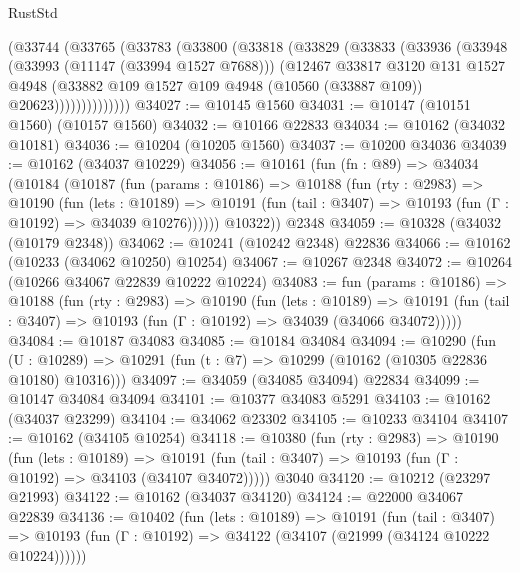 \begin{lexlean}{RustStd}
\begin{coremodule}
          (@33744
            (@33765
              (@33783
                (@33800
                  (@33818
                    (@33829
                      (@33833
                        (@33936
                          (@33948
                            (@33993 (@11147 (@33994 @1527 @7688)))
                            (@12467
                              @33817
                              @3120
                              @131
                              @1527
                              @4948
                              (@33882
                                @109
                                @1527
                                @109
                                @4948
                                (@10560 (@33887 @109))
                                @20623))))))))))))))
@34027 := @10145 @1560
@34031 := @10147 (@10151 @1560) (@10157 @1560)
@34032 := @10166 @22833
@34034 := @10162 (@34032 @10181)
@34036 := @10204 (@10205 @1560)
@34037 := @10200 @34036
@34039 := @10162 (@34037 @10229)
@34056 := @10161
    (fun (fn : @89) =>
    @34034
      (@10184
        (@10187
          (fun (params : @10186) =>
          @10188
            (fun (rty : @2983) =>
            @10190
              (fun (lets : @10189) =>
              @10191 (fun (tail : @3407) => @10193 (fun (Γ : @10192) => @34039 @10276))))))
        @10322))
    @2348
@34059 := @10328 (@34032 (@10179 @2348))
@34062 := @10241 (@10242 @2348) @22836
@34066 := @10162 (@10233 (@34062 @10250) @10254)
@34067 := @10267 @2348
@34072 := @10264 (@10266 @34067 @22839 @10222 @10224)
@34083 := fun (params : @10186) =>
  @10188
    (fun (rty : @2983) =>
    @10190
      (fun (lets : @10189) =>
      @10191 (fun (tail : @3407) => @10193 (fun (Γ : @10192) => @34039 (@34066 @34072)))))
@34084 := @10187 @34083
@34085 := @10184 @34084
@34094 := @10290
    (fun (U : @10289) => @10291 (fun (t : @7) => @10299 (@10162 (@10305 @22836 @10180) @10316)))
@34097 := @34059 (@34085 @34094) @22834
@34099 := @10147 @34084 @34094
@34101 := @10377 @34083 @5291
@34103 := @10162 (@34037 @23299)
@34104 := @34062 @23302
@34105 := @10233 @34104
@34107 := @10162 (@34105 @10254)
@34118 := @10380
    (fun (rty : @2983) =>
    @10190
      (fun (lets : @10189) =>
      @10191 (fun (tail : @3407) => @10193 (fun (Γ : @10192) => @34103 (@34107 @34072)))))
    @3040
@34120 := @10212 (@23297 @21993)
@34122 := @10162 (@34037 @34120)
@34124 := @22000 @34067 @22839
@34136 := @10402
    (fun (lets : @10189) =>
    @10191
      (fun (tail : @3407) =>
      @10193 (fun (Γ : @10192) => @34122 (@34107 (@21999 (@34124 @10222 @10224))))))

\end{coremodule}
\end{lexlean}

